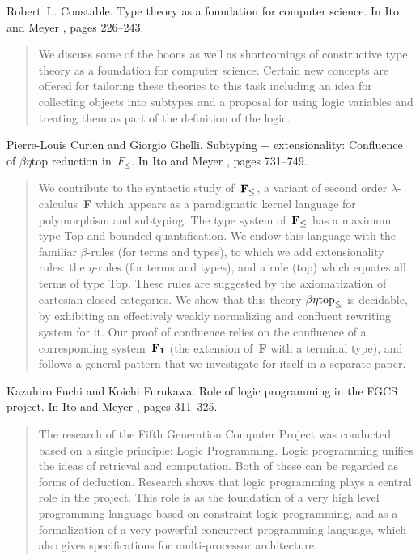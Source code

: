 \begin{thebibliography}{10}
Robert~L. Constable.
\newblock Type theory as a foundation for computer science.
\newblock In Ito and Meyer \cite{TACS91}, pages 226--243.
\begin{quotation}
We discuss some of the boons as well as shortcomings of constructive type
  theory as a foundation for computer science. Certain new concepts are offered
  for tailoring these theories to this task including an idea for collecting
  objects into subtypes and a proposal for using logic variables and treating
  them as part of the definition of the logic.
\end{quotation}

Pierre-Louis Curien and Giorgio Ghelli.
\newblock Subtyping + extensionality: Confluence of $\beta\eta$top reduction
  in~{$F_\leq$}.
\newblock In Ito and Meyer \cite{TACS91}, pages 731--749.
\begin{quotation}
We contribute to the syntactic study of~${\bf F}_\leq$, a variant of second
  order $\lambda$-calculus~{\bf F} which appears as a paradigmatic kernel
  language for polymorphism and subtyping. The type system of~${\bf F}_\leq$
  has a maximum type Top and bounded quantification. We endow this language
  with the familiar $\beta$-rules (for terms and types), to which we add
  extensionality rules: the $\eta$-rules (for terms and types), and a rule
  (top) which equates all terms of type Top. These rules are suggested by the
  axiomatization of cartesian closed categories. We show that this theory
  $\beta\eta{\rm top}_\leq$ is decidable, by exhibiting an effectively weakly
  normalizing and confluent rewriting system for it. Our proof of confluence
  relies on the confluence of a corresponding system~$\bf F_1$ (the extension
  of~{\bf F} with a terminal type), and follows a general pattern that we
  investigate for itself in a separate paper.
\end{quotation}

Kazuhiro Fuchi and Koichi Furukawa.
\newblock Role of logic programming in the {FGCS} project.
\newblock In Ito and Meyer \cite{TACS91}, pages 311--325.
\begin{quotation}
The research of the Fifth Generation Computer Project was conducted based on a
  single principle: Logic Programming. Logic programming unifies the ideas of
  retrieval and computation. Both of these can be regarded as forms of
  deduction. Research shows that logic programming plays a central role in the
  project. This role is as the foundation of a very high level programming
  language based on constraint logic programming, and as a formalization of a
  very powerful concurrent programming language, which also gives
  specifications for multi-processor architecture.
\end{quotation}


\end{thebibliography}
